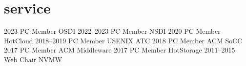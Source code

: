 \section{service}

\begin{entrylist}
    \eduentry
    {2023}
    {PC Member}
    {OSDI}
    \eduentry
    {2022--2023}
    {PC Member}
    {NSDI}
    \eduentry
    {2020}
    {PC Member}
    {HotCloud}
    \eduentry
    {2018--2019}
    {PC Member}
    {USENIX ATC}
    \eduentry
    {2018}
    {PC Member}
    {ACM SoCC}
    \eduentry
    {2017}
    {PC Member}
    {ACM Middleware}
    \eduentry
    {2017}
    {PC Member}
    {HotStorage}
    \eduentry
    {2011--2015}
    {Web Chair}
    {NVMW}
\end{entrylist}